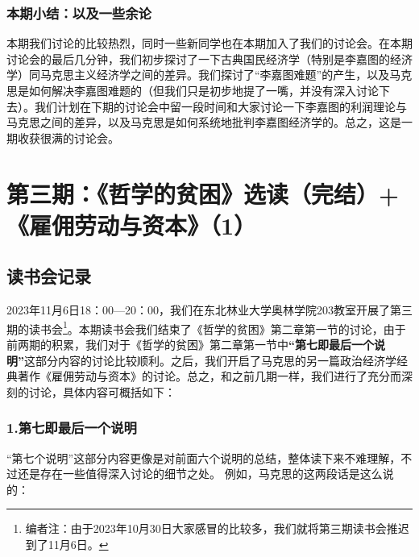 \documentclass[a4paper,twoside,12pt,AutoFakeBold]{ctexart}
\begin{document}
\subsubsection{本期小结：以及一些余论}
本期我们讨论的比较热烈，同时一些新同学也在本期加入了我们的讨论会。在本期讨论会的最后几分钟，我们初步探讨了一下古典国民经济学（特别是李嘉图的经济学）同马克思主义经济学之间的差异。我们探讨了“李嘉图难题”的产生，以及马克思是如何解决李嘉图难题的（但我们只是初步地提了一嘴，并没有深入讨论下去）。我们计划在下期的讨论会中留一段时间和大家讨论一下李嘉图的利润理论与马克思之间的差异，以及马克思是如何系统地批判李嘉图经济学的。总之，这是一期收获很满的讨论会。
\newpage
\section{第三期：《哲学的贫困》选读（完结）+《雇佣劳动与资本》（1）}

\subsection{读书会记录}
2023年11月6日18：00—20：00，我们在东北林业大学奥林学院203教室开展了第三期的读书会\footnote{编者注：由于2023年10月30日大家感冒的比较多，我们就将第三期读书会推迟到了11月6日。}。本期读书会我们结束了《哲学的贫困》第二章第一节的讨论，由于前两期的积累，我们对于《哲学的贫困》第二章第一节中\textbf{“第七即最后一个说明”}这部分内容的讨论比较顺利。之后，我们开启了马克思的另一篇政治经济学经典著作《雇佣劳动与资本》的讨论。总之，和之前几期一样，我们进行了充分而深刻的讨论，具体内容可概括如下：

\subsubsection{1.第七即最后一个说明}
“第七个说明”这部分内容更像是对前面六个说明的总结，整体读下来不难理解，不过还是存在一些值得深入讨论的细节之处。
例如，马克思的这两段话是这么说的：
\end{document}

